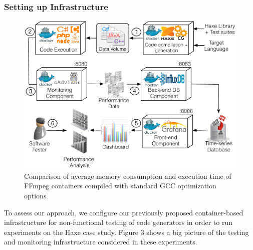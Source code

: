 \subsubsection{Setting up Infrastructure}
\begin{figure}[h]
	\centering
	\includegraphics[width=1\linewidth]{Ressources/settingup.pdf}
	\caption{Comparison of average memory consumption and execution time of FFmpeg containers compiled with standard GCC optimization options}
\end{figure}
To assess our approach, we configure our previously proposed container-based infrastructure for non-functional testing of code generators in order to run experiments on the Haxe case study.
Figure 3 shows a big picture of the testing and monitoring infrastructure considered in these experiments.


